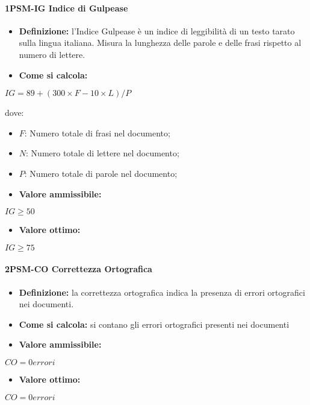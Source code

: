 \paragraph*{1PSM-IG Indice di Gulpease}
\begin{itemize}
    \item \textbf{Definizione:} l’Indice Gulpease è un indice di leggibilità di un testo tarato sulla lingua italiana. Misura la lunghezza delle parole e delle frasi rispetto al numero di lettere.
    \item \textbf{Come si calcola:}
\end{itemize}
\begin{center}
   $IG = 89 + (300 \times F - 10 \times L)/P$ 
\end{center}
dove:
\begin{itemize}[label=$\rightarrow$]
    \item $F$: Numero totale di frasi nel documento;
    \item $N$: Numero totale di lettere nel documento;
    \item $P$: Numero totale di parole nel documento;
\end{itemize}
\begin{itemize}
    \item \textbf{Valore ammissibile:}
\end{itemize}
\begin{center}
    $IG \geq 50$
\end{center}
\begin{itemize}
    \item \textbf{Valore ottimo:}
\end{itemize}
\begin{center}
    $IG \geq 75$
\end{center}

\paragraph*{2PSM-CO Correttezza Ortografica}
\begin{itemize}
    \item \textbf{Definizione:} la correttezza ortografica indica la presenza di errori ortografici nei documenti.
    \item \textbf{Come si calcola:} si contano gli errori ortografici presenti nei documenti
\end{itemize}
\begin{itemize}
    \item \textbf{Valore ammissibile:}
\end{itemize}
\begin{center}
    $CO = 0 errori$
\end{center}
\begin{itemize}
    \item \textbf{Valore ottimo:}
\end{itemize}
\begin{center}
    $CO = 0 errori$
\end{center}

